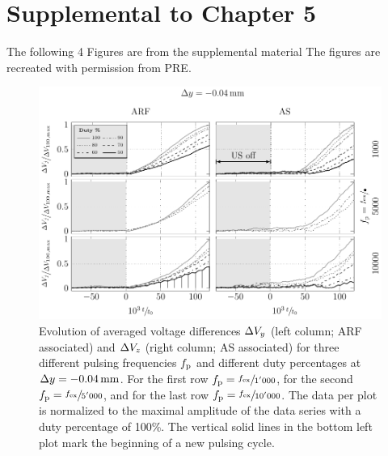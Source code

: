 \chapter[Appendix]{Supplemental to Chapter 5\label{ch:app-pulsing}}

The following 4 Figures are from the supplemental material 
The figures are recreated with permission from PRE.

\begin{figure}[tbp]
  \centering
  \includegraphics[]{External/duty-m04.pdf}
  \caption{Evolution of averaged voltage differences $\Delta V_{y}$ (left column; 
      ARF associated) and $\Delta V_{z}$ (right column; AS associated) for three 
      different pulsing frequencies $f_{\mathrm{p}}$ and different duty percentages at 
      $\Dy=\SI{-0.04}{\mm}$. For the first row $f_{\mathrm{p}}=\sfrac{f_{\mathrm{ex}}}{1'000}$, for 
      the second $f_{\mathrm{p}}=\sfrac{f_{\mathrm{ex}}}{5'000}$, and for the last row 
      $f_{\mathrm{p}}=\sfrac{f_{\mathrm{ex}}}{10'000}$. The data per plot is normalized to the 
      maximal amplitude of the data series with a duty percentage of 100\%. The 
      vertical solid lines in the bottom left plot mark the beginning of a new 
      pulsing cycle.
}
\end{figure}
\newpage

